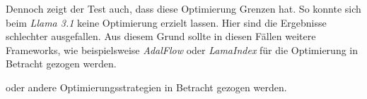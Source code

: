 Dennoch zeigt der Test auch, dass diese Optimierung Grenzen hat. So konnte sich beim \textit{Llama 3.1} keine Optimierung erzielt lassen. Hier sind die Ergebnisse schlechter ausgefallen. Aus diesem Grund sollte in diesen Fällen weitere Frameworks, wie beispielsweise \textit{AdalFlow} oder \textit{LamaIndex} für die Optimierung in Betracht gezogen werden.\vspace{0.2cm}

oder andere Optimierungsstrategien in Betracht gezogen werden.\vspace{0.2cm}




